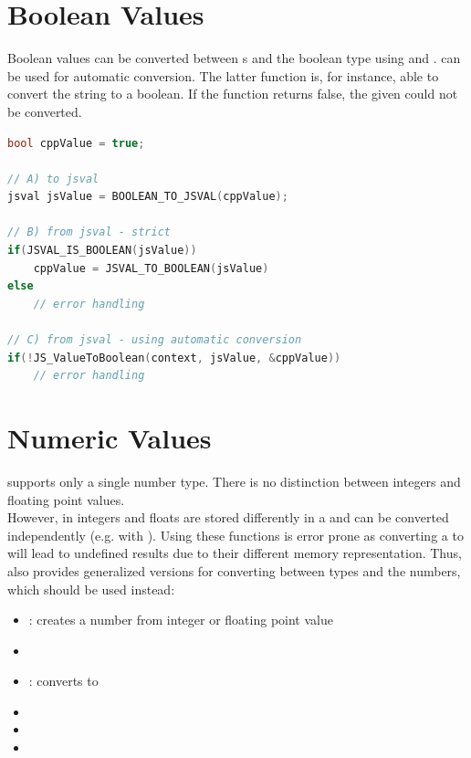\section{Boolean Values}

Boolean values can be converted between s and the  boolean type using  and .  can be used for \linebreak automatic conversion. The latter function is, for instance, able to convert the string   to a  boolean. If the function returns false, the given  could not be converted.

\SingleSpacing
\begin{lstlisting}[language=C++, caption=Conversion of boolean values]
bool cppValue = true;

// A) to jsval
jsval jsValue = BOOLEAN_TO_JSVAL(cppValue);

// B) from jsval - strict
if(JSVAL_IS_BOOLEAN(jsValue))
	cppValue = JSVAL_TO_BOOLEAN(jsValue)
else
	// error handling
	
// C) from jsval - using automatic conversion
if(!JS_ValueToBoolean(context, jsValue, &cppValue))
	// error handling
\end{lstlisting}
\OnehalfSpacing

\section{Numeric Values}

 supports only a single number type. There is no distinction between integers and floating point values.\\
However, in  integers and floats are stored differently in a  and can be converted independently (e.g. with ). Using these functions is error prone as converting a   to  will lead to undefined results due to their different memory representation. Thus,  also provides generalized versions for converting between  types and the  numbers, which should be used instead:

\vspace{-10pt}
\begin{itemize}\addtolength{\itemsep}{-0.5\baselineskip}
	\item {}: creates a number  from integer or floating point value
	\item {}
	\item {}: converts to 
	\item {}
	\item {}
	\item {}
\end{itemize}
\vspace{-10pt}

